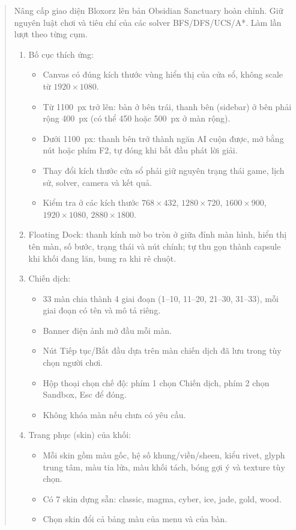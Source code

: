 \begin{quote}
\small
\setlength{\emergencystretch}{2em}
Nâng cấp giao diện Bloxorz lên bản Obsidian Sanctuary hoàn chỉnh. Giữ nguyên luật chơi và tiêu chí của các solver BFS/DFS/UCS/A*. Làm lần lượt theo từng cụm.

\begin{enumerate}[label=\Alph*.]
  \item Bố cục thích ứng:
  \begin{itemize}
    \item Canvas có đúng kích thước vùng hiển thị của cửa sổ, không scale từ $1920\times1080$.
    \item Từ 1100~px trở lên: bàn ở bên trái, thanh bên (sidebar) ở bên phải rộng 400~px (có thể 450 hoặc 500~px ở màn rộng).
    \item Dưới 1100~px: thanh bên trở thành ngăn AI cuộn được, mở bằng nút hoặc phím F2, tự đóng khi bắt đầu phát lời giải.
    \item Thay đổi kích thước cửa sổ phải giữ nguyên trạng thái game, lịch sử, solver, camera và kết quả.
    \item Kiểm tra ở các kích thước $768\times432$, $1280\times720$, $1600\times900$, $1920\times1080$, $2880\times1800$.
  \end{itemize}

  \item Floating Dock: thanh kính mờ bo tròn ở giữa đỉnh màn hình, hiển thị tên màn, số bước, trạng thái và nút chính; tự thu gọn thành capsule khi khối đang lăn, bung ra khi rê chuột.

  \item Chiến dịch:
  \begin{itemize}
    \item 33 màn chia thành 4 giai đoạn (1--10, 11--20, 21--30, 31--33), mỗi giai đoạn có tên và mô tả riêng.
    \item Banner điện ảnh mở đầu mỗi màn.
    \item Nút Tiếp tục/Bắt đầu dựa trên màn chiến dịch đã lưu trong tùy chọn người chơi.
    \item Hộp thoại chọn chế độ: phím 1 chọn Chiến dịch, phím 2 chọn Sandbox, Esc để đóng.
    \item Không khóa màn nếu chưa có yêu cầu.
  \end{itemize}

  \item Trang phục (skin) của khối:
  \begin{itemize}
    \item Mỗi skin gồm màu gốc, hệ số khung/viền/sheen, kiểu rivet, glyph trung tâm, màu tia lửa, màu khối tách, bóng gợi ý và texture tùy chọn.
    \item Có 7 skin dựng sẵn: classic, magma, cyber, ice, jade, gold, wood.
    \item Chọn skin đổi cả bảng màu của menu và của bàn.
  \end{itemize}


\end{enumerate}
\end{quote}
